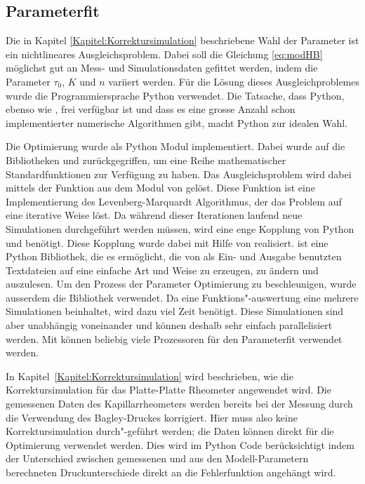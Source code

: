 \subsection{Parameterfit}
Die in Kapitel \ref{Kapitel:Korrektursimulation} beschriebene Wahl der Parameter ist ein nichtlineares Ausgleichsproblem. Dabei soll die Gleichung \eqref{eq:modHB} möglichst gut an Mess- und Simulationsdaten gefittet werden, indem die Parameter $\tau_0$, $K$ und $n$ variiert werden.
Für die Lösung dieses Ausgleichproblemes wurde die Programmiersprache Python verwendet. Die Tatsache, dass Python, ebenso wie \openfoam{}, frei verfügbar ist und dass es eine grosse Anzahl schon implementierter numerische Algorithmen gibt, macht Python zur idealen Wahl.

Die Optimierung wurde als Python Modul  implementiert. Dabei wurde auf die Bibliotheken  und  \cite{scipy} zurückgegriffen, um eine Reihe mathematischer Standardfunktionen zur Verfügung zu haben.
Das Ausgleichsproblem wird dabei mittels der Funktion  aus dem Modul  von  gelöst.
Diese Funktion ist eine Implementierung des Levenberg-Marquardt Algorithmus, der das Problem auf eine iterative Weise löst.
Da während dieser Iterationen laufend neue Simulationen durchgeführt werden müssen, wird eine enge Kopplung von Python und \openfoam{} benötigt.
Diese Kopplung wurde dabei mit Hilfe von  \cite{pyfoam} realisiert.  ist eine Python Bibliothek, die es ermöglicht, die von \openfoam{} als Ein- und Ausgabe benutzten Textdateien auf eine einfache Art und Weise zu erzeugen, zu ändern und auszulesen.
Um den Prozess der Parameter Optimierung zu beschleunigen, wurde ausserdem die Bibliothek  \cite{parallelpython} verwendet. Da eine Funktions"-auswertung eine mehrere Simulationen beinhaltet, wird dazu viel Zeit benötigt. Diese Simulationen sind aber unabhängig voneinander und können deshalb sehr einfach parallelisiert werden. Mit  können beliebig viele Prozessoren für den Parameterfit verwendet werden.

In Kapitel~\ref{Kapitel:Korrektursimulation} wird beschrieben, wie die Korrektursimulation für das Platte-Platte Rheometer angewendet wird. Die gemessenen Daten des Kapillarrheometers werden bereits bei der Messung durch die Verwendung des Bagley-Druckes korrigiert. Hier muss also keine Korrektursimulation durch"-geführt werden; die Daten können direkt für die Optimierung verwendet werden. Dies wird im Python Code berücksichtigt indem der Unterschied zwischen gemessenen und aus den Modell-Parametern berechneten Druckunterschiede direkt an die Fehlerfunktion angehängt wird.

